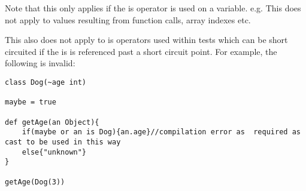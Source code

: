 \documentclass[conc-doc]{subfiles}
\begin{document}
Note that this only applies if the is operator is used on a variable. e.g. This does not apply to values resulting from function calls, array indexes etc.

This also does not apply to is operators used within tests which can be short circuited if the is is referenced past a short circuit point. For example, the following is invalid:

\begin{lstlisting}
class Dog(~age int)

maybe = true

def getAge(an Object){
	if(maybe or an is Dog){an.age}//compilation error as  required as cast to be used in this way
	else{"unknown"}
}

getAge(Dog(3))
\end{lstlisting}
\end{document}
